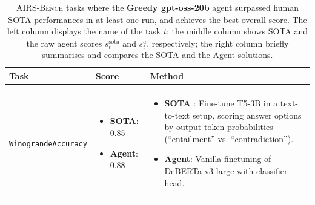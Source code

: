 \documentclass{fairmeta}
\newcommand{\airsbench}{\textsc{AIRS-Bench}}
\begin{document}

\begin{table}[htbp]
\centering
\footnotesize
\begin{tabularx}{\textwidth}{p{} p{} X}
\toprule
\rowcolor{faintblue}
\textbf{Task} & \textbf{Score} & \textbf{Method} \\
\midrule
\makecell[l]{\texttt{CoreferenceResolution-}\\\texttt{WinograndeAccuracy}} &
\begin{itemize}[nosep,leftmargin=*]
    \item \textbf{SOTA}: 0.85
    \item \textbf{Agent}: \underline{0.88}
\end{itemize} &
\begin{itemize}[nosep,leftmargin=*]
    \item \textbf{SOTA} \citep{lin2020tttttackling}: Fine-tune T5-3B in a text-to-text setup, scoring answer options by output token probabilities (“entailment” vs. “contradiction”).
    \item \textbf{Agent}: Vanilla finetuning of DeBERTa-v3-large with classifier head.
\end{itemize} \\
\bottomrule
\end{tabularx}
\caption{\airsbench{} tasks where the \textbf{Greedy gpt-oss-20b} agent surpassed human SOTA performances in at least one run, and achieves the best overall score. The left column displays the name of the task $t$; the middle column shows SOTA and the raw agent scores $s^\mathrm{sota}_t$ and $s_t^a$, respectively; the right column briefly summarises and compares the SOTA and the Agent solutions.}
\label{tab:beat-sota-greedygptoss20b}

\end{table}
\end{document}
